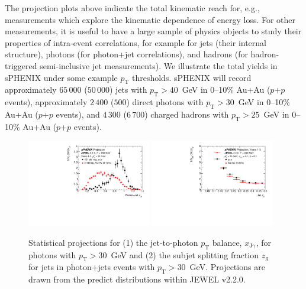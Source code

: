 The projection plots above indicate the total kinematic reach for, e.g., measurements which explore the kinematic dependence of energy loss. For other measurements, it is useful to have a large sample of physics objects to study their properties of intra-event correlations, for example for jets (their internal structure), photons (for photon+jet correlations), and hadrons (for hadron-triggered semi-inclusive jet measurements). We illustrate the total yields in sPHENIX under some example $p_\mathrm{T}$ thresholds. sPHENIX will record approximately $65\,000$ ($50\,000$) jets with $p_\mathrm{T} > 40$~GeV in 0--10\% Au+Au ($p$+$p$ events), approximately $2\,400$ ($500$) direct photons with $p_\mathrm{T} > 30$~GeV in 0--10\% Au+Au ($p$+$p$ events), and $4\,300$ ($6\,700$) charged hadrons with $p_\mathrm{T} > 25$~GeV in 0--10\% Au+Au ($p$+$p$ events). 

\begin{figure}[h]
\centering
\includegraphics[width=0.48\textwidth]{figs/xJg_1.pdf}
\includegraphics[width=0.48\textwidth]{figs/zg_1.pdf}
\caption{Statistical projections for (1) the jet-to-photon $p_\mathrm{T}$ balance, $x_\mathrm{J\gamma}$, for photons with $p_\mathrm{T} > 30$~GeV and (2) the subjet splitting fraction $z_g$ for jets in photon+jets events with $p_\mathrm{T} > 30$~GeV. Projections are drawn from the predict distributions within JEWEL v2.2.0.}
\label{fig:jet_JEWEL_proj}
\end{figure}

